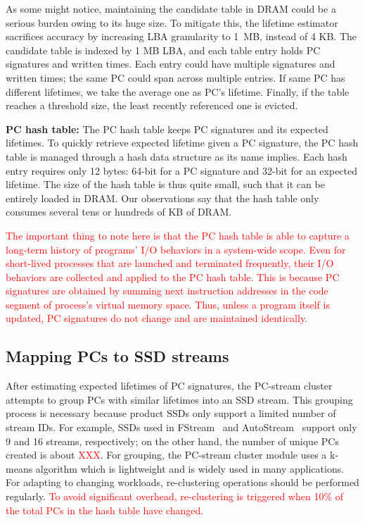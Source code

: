 As some might notice, maintaining the candidate table in DRAM could be a
serious burden owing to its huge size. To mitigate this, the lifetime estimator
sacrifices accuracy by increasing LBA granularity to 1~MB, instead of 4 KB.
The candidate table is indexed by 1 MB LBA, and each table entry holds PC
signatures and written times. Each entry could have multiple signatures and
written times; the same PC could span across multiple entries.  If same PC has
different lifetimes, we take the average one as PC's lifetime. Finally, if the
table reaches a threshold size, the least recently referenced one is evicted. 

\textbf{PC hash table:}
The PC hash table keeps PC signatures and its expected lifetimes. To quickly
retrieve expected lifetime given a PC signature, the PC hash table is managed
through a hash data structure as its name implies. Each hash entry requires
only 12 bytes: 64-bit for a PC signature and 32-bit for an expected lifetime.
The size of the hash table is thus quite small, such that it can be entirely
loaded in DRAM. Our observations say that the hash table only consumes several
tens or hundreds of KB of DRAM.

\textcolor{red}{
The important thing to note here is that the PC hash table is able to capture a
long-term history of programs' I/O behaviors in a system-wide scope.  Even for
short-lived processes that are launched and terminated frequently, their I/O
behaviors are collected and applied to the PC hash table.  This is because PC signatures are
obtained by summing next instruction addresses in the code segment of process's
virtual memory space. Thus, unless a program itself is updated, PC signatures do not change
and are maintained identically.
}

\subsection{Mapping PCs to SSD streams}

After estimating expected lifetimes of PC signatures, the \textsf{PC-stream
cluster} attempts to group PCs with similar lifetimes into an SSD stream.  This
grouping process is necessary because product SSDs only support a limited
number of stream IDs. For example, SSDs used in \textsf{\small
FStream}~\cite{FStream} and \textsf{\small AutoStream}~\cite{AutoStream}
support only 9 and 16 streams, respectively; on the other hand, the number of
unique PCs created is about \textcolor{red}{XXX}.  For grouping, the PC-stream
cluster module uses a k-means algorithm which is lightweight and is widely used
in many applications. For adapting to changing workloads, re-clustering
operations should be performed regularly. \textcolor{red}{To avoid significant
overhead, re-clustering is triggered when 10\% of the total PCs in the hash
table have changed}.

